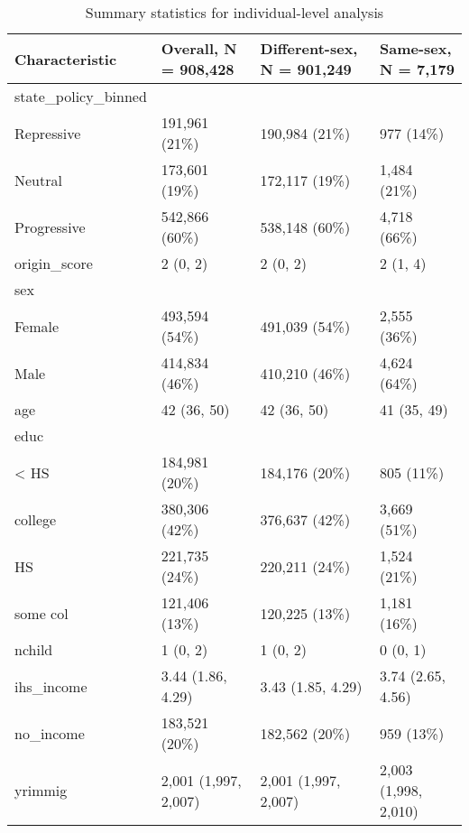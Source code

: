 \documentclass[
  11pt,
]{article}
\begin{document}
\begin{table}

\caption{\label{tab:desc-table-ind}Summary statistics for individual-level analysis}
\centering
\fontsize{8}{10}\selectfont
\begin{tabular}[t]{llll}
\toprule
Characteristic & Overall, N = 908,428 & Different-sex, N = 901,249 & Same-sex, N = 7,179\\
\midrule
state\_policy\_binned &  &  & \\
\hspace{1em}Repressive & 191,961 (21\%) & 190,984 (21\%) & 977 (14\%)\\
\hspace{1em}Neutral & 173,601 (19\%) & 172,117 (19\%) & 1,484 (21\%)\\
\hspace{1em}Progressive & 542,866 (60\%) & 538,148 (60\%) & 4,718 (66\%)\\
origin\_score & 2 (0, 2) & 2 (0, 2) & 2 (1, 4)\\
\addlinespace
sex &  &  & \\
\hspace{1em}Female & 493,594 (54\%) & 491,039 (54\%) & 2,555 (36\%)\\
\hspace{1em}Male & 414,834 (46\%) & 410,210 (46\%) & 4,624 (64\%)\\
age & 42 (36, 50) & 42 (36, 50) & 41 (35, 49)\\
educ &  &  & \\
\addlinespace
\hspace{1em}< HS & 184,981 (20\%) & 184,176 (20\%) & 805 (11\%)\\
\hspace{1em}college & 380,306 (42\%) & 376,637 (42\%) & 3,669 (51\%)\\
\hspace{1em}HS & 221,735 (24\%) & 220,211 (24\%) & 1,524 (21\%)\\
\hspace{1em}some col & 121,406 (13\%) & 120,225 (13\%) & 1,181 (16\%)\\
nchild & 1 (0, 2) & 1 (0, 2) & 0 (0, 1)\\
\addlinespace
ihs\_income & 3.44 (1.86, 4.29) & 3.43 (1.85, 4.29) & 3.74 (2.65, 4.56)\\
no\_income & 183,521 (20\%) & 182,562 (20\%) & 959 (13\%)\\
yrimmig & 2,001 (1,997, 2,007) & 2,001 (1,997, 2,007) & 2,003 (1,998, 2,010)\\

\end{tabular}
\end{table}
\end{document}
